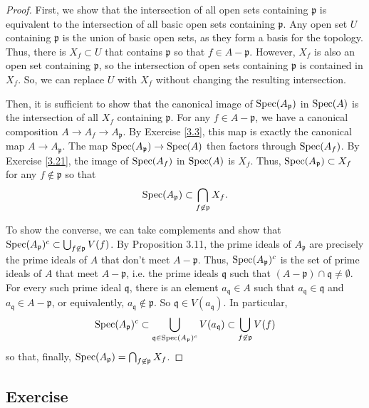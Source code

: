 \begin{proof}
First, we show that the intersection of all open sets containing $\mathfrak{p}$ is equivalent to the intersection of all basic open sets containing $\mathfrak{p}$. Any open set $U$ containing $\mathfrak{p}$ 
is the union of basic open sets, as they form a basis for the topology. Thus, there is $X_f \subset U$ that contains $\mathfrak{p}$ so that $f \in A - \mathfrak{p}$. However, $X_f$ is also an open set 
containing $\mathfrak{p}$, so the intersection of open sets containing $\mathfrak{p}$ is contained in $X_f$. So, we can replace $U$ with $X_f$ without changing the resulting intersection.

Then, it is sufficient to show that the canonical image of $\operatorname{Spec}(A_{\mathfrak{p}})$ in $\operatorname{Spec}(A)$ is the intersection of all $X_f$ containing $\mathfrak{p}$. For any $f \in A - \mathfrak{p}$, we have a 
canonical composition $A \to A_f \to A_{\mathfrak{p}}$. By Exercise \ref{3.3}, this map is exactly the canonical map $A \to A_{\mathfrak{p}}$. The map $\operatorname{Spec}(A_{\mathfrak{p}}) \to \operatorname{Spec}(A)$ then
factors through $\operatorname{Spec}(A_f)$. By Exercise \ref{3.21}, the image of $\operatorname{Spec}(A_f)$ in $\operatorname{Spec}(A)$ is $X_f$. Thus, $\operatorname{Spec}(A_{\mathfrak{p}}) \subset X_f$ for any $f \not\in \mathfrak{p}$ so that
$$\operatorname{Spec}(A_{\mathfrak{p}}) \subset \bigcap_{f \not\in \mathfrak{p}} X_f.$$

To show the converse, we can take complements and show that $\operatorname{Spec}(A_{\mathfrak{p}})^c \subset \bigcup_{f \not\in \mathfrak{p}}V(f)$. By Proposition 3.11, the prime ideals of $A_{\mathfrak{p}}$
are precisely the prime ideals of $A$ that don't meet $A-\mathfrak{p}$. Thus, $\operatorname{Spec}(A_{\mathfrak{p}})^c$ is the set of prime ideals of $A$ that meet $A - \mathfrak{p}$, i.e. the prime ideals
$\mathfrak{q}$ such that $(A - \mathfrak{p})\cap\mathfrak{q} \neq \emptyset$. For every such prime ideal $\mathfrak{q}$, there is an element $a_{\mathfrak{q}} \in A$ such that $a_{\mathfrak{q}} \in \mathfrak{q}$
and $a_{\mathfrak{q}} \in A - \mathfrak{p}$, or equivalently, $a_{\mathfrak{q}} \not\in \mathfrak{p}$. So $\mathfrak{q} \in V(a_{\mathfrak{q}})$. In particular,
$$\operatorname{Spec}(A_{\mathfrak{p}})^c \subset \bigcup_{\mathfrak{q} \in \operatorname{Spec}(A_{\mathfrak{p}})^c}V(a_{\mathfrak{q}}) \subset \bigcup_{f \not\in \mathfrak{p}}V(f)$$
so that, finally, $\operatorname{Spec}(A_{\mathfrak{p}}) = \bigcap_{f \not\in \mathfrak{p}}X_f$.
\end{proof}

\subsection{Exercise}\label{3.23}

